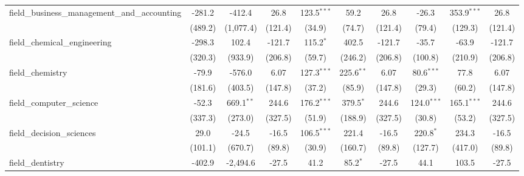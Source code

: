 \begin{tabular}{lccccccccc}
   field\_business\_management\_and\_accounting                & -281.2           & -412.4          & 26.8           & 123.5$^{***}$ & 59.2          & 26.8           & -26.3         & 353.9$^{***}$ & 26.8\\   
                                                               & (489.2)          & (1,077.4)       & (121.4)        & (34.9)        & (74.7)        & (121.4)        & (79.4)        & (129.3)       & (121.4)\\   
   field\_chemical\_engineering                                & -298.3           & 102.4           & -121.7         & 115.2$^{*}$   & 402.5         & -121.7         & -35.7         & -63.9         & -121.7\\   
                                                               & (320.3)          & (933.9)         & (206.8)        & (59.7)        & (246.2)       & (206.8)        & (100.8)       & (210.9)       & (206.8)\\   
   field\_chemistry                                            & -79.9            & -576.0          & 6.07           & 127.3$^{***}$ & 225.6$^{**}$  & 6.07           & 80.6$^{***}$  & 77.8          & 6.07\\   
                                                               & (181.6)          & (403.5)         & (147.8)        & (37.2)        & (85.9)        & (147.8)        & (29.3)        & (60.2)        & (147.8)\\   
   field\_computer\_science                                    & -52.3            & 669.1$^{**}$    & 244.6          & 176.2$^{***}$ & 379.5$^{*}$   & 244.6          & 124.0$^{***}$ & 165.1$^{***}$ & 244.6\\   
                                                               & (337.3)          & (273.0)         & (327.5)        & (51.9)        & (188.9)       & (327.5)        & (30.8)        & (53.2)        & (327.5)\\   
   field\_decision\_sciences                                   & 29.0             & -24.5           & -16.5          & 106.5$^{***}$ & 221.4         & -16.5          & 220.8$^{*}$   & 234.3         & -16.5\\   
                                                               & (101.1)          & (670.7)         & (89.8)         & (30.9)        & (160.7)       & (89.8)         & (127.7)       & (417.0)       & (89.8)\\   
   field\_dentistry                                            & -402.9           & -2,494.6        & -27.5          & 41.2          & 85.2$^{*}$    & -27.5          & 44.1          & 103.5         & -27.5\\   

\end{tabular}
